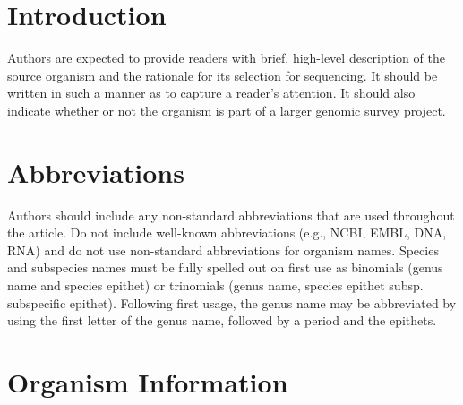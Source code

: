 \documentclass{bmcart}
\begin{document}


\section*{Introduction}
Authors are expected to provide readers with brief, high-level description of the source organism and the rationale for its selection for sequencing. It should be written in such a manner as to capture a reader’s attention. It should also indicate whether or not the organism is part of a larger genomic survey project.

\section*{Abbreviations}
Authors should include any non-standard abbreviations that are used throughout the article. Do not include well-known abbreviations (e.g., NCBI, EMBL, DNA, RNA) and do not use non-standard abbreviations for organism names. Species and subspecies names must be fully spelled out on first use as binomials (genus name and species epithet) or trinomials (genus name, species epithet subsp. subspecific epithet). Following first usage, the genus name may be abbreviated by using the first letter of the genus name, followed by a period and the epithets.


\section*{Organism Information}
\end{document}

